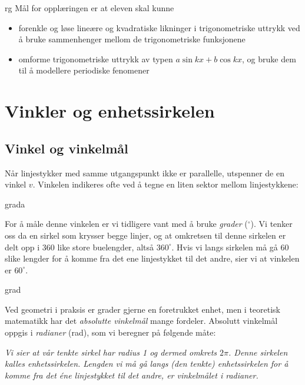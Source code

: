 



{rg}
\eqlen
\vspace{\parskip}
Mål for opplæringen er at eleven skal kunne
\begin{itemize}
	\item forenkle og løse lineære og kvadratiske likninger i trigonometriske uttrykk ved å bruke sammenhenger mellom de trigonometriske funksjonene
	\item omforme trigonometriske uttrykk av typen $ a \sin kx + b \cos kx $, og bruke dem til å modellere periodiske fenomener
\end{itemize}
\newpage
\section{Vinkler og enhetssirkelen}
\subsection{Vinkel og vinkelmål}
Når linjestykker med samme utgangspunkt ikke er parallelle, utspenner de en vinkel $ v $. Vinkelen indikeres ofte ved å tegne en liten sektor mellom linjestykkene:

{grada}

For å måle denne vinkelen er vi tidligere vant med å bruke \textit{grader} ($ ^\circ $). Vi tenker oss da en sirkel som krysser begge linjer, og at omkretsen til denne sirkelen er delt opp i 360 like store buelengder, altså $ 360^\circ $. Hvis vi langs sirkelen må gå 60 slike lengder for å komme fra det ene linjestykket til det andre, sier vi at vinkelen er $ 60^\circ $.

{grad}

Ved geometri i praksis er grader gjerne en foretrukket enhet, men i teoretisk matematikk har det \textit{absolutte vinkelmål} mange fordeler. Absolutt vinkelmål oppgis i \textit{radianer} (rad), som vi beregner på følgende måte: \regv

\textsl{Vi sier at vår tenkte sirkel har radius 1 og dermed omkrets $ 2\pi $. Denne sirkelen kalles \textit{enhetssirkelen}. Lengden vi må gå langs (den tenkte) enhetssirkelen for å komme fra det éne linjestykket til det andre, er vinkelmålet i radianer.}

